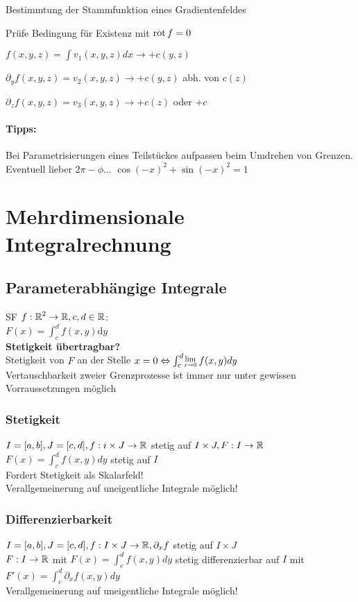 \documentclass[german]{latex4ei/latex4ei_sheet}
\begin{document}
\begin{cookbox}{Bestimmtung der Stammfunktion eines Gradientenfeldes}
\item Pr\"ufe Bedingung f\"ur Existenz mit $\operatorname{rot} f=0$
\item $f(x,y,z)=\int v_1(x,y,z) d x \rightarrow + c(y,z)$
\item $\partial_y f(x,y,z)=v_2(x,y,z) \rightarrow + c(y,z)$ abh. von $c(z)$
\item $\partial_z f(x,y,z)=v_3(x,y,z) \rightarrow +c(z) $ oder $+c$
\end{cookbox}

\paragraph{Tipps:} Bei Parametrisierungen eines Teilst\"uckes aufpassen beim Umdrehen von Grenzen. Eventuell lieber $2 \pi - \phi$... $\cos(-x)^2+\sin(-x)^2=1$

\section{Mehrdimensionale Integralrechnung}
\subsection{Parameterabh\"angige Integrale}
SF $f:\operatorname{\mathbb R}^2 \to \operatorname{\mathbb R}, c,d \in \operatorname{\mathbb R}$:\\
$F(x)=\int_c^d \! f(x,y) \mathrm{d} y$\\
\textbf{Stetigkeit \"ubertragbar?}\\
Stetigkeit von $F$ an der Stelle $x = 0 \Leftrightarrow \int_c^d \! \Lim{x \to 0} f(x,y) d y$\\
Vertauschbarkeit zweier Grenzprozesse ist immer nur unter gewissen Vorraussetzungen m\"oglich\\

\subsubsection{Stetigkeit}
$I=[a,b], J=[c,d], f: i \times J \to \operatorname{\mathbb R}$ stetig auf $I \times J, F: I \to \operatorname{\mathbb R}$\\
$F(x)=\int_c^d \! f(x,y) d y$ stetig auf $I$\\
Fordert Stetigkeit als Skalarfeld!\\
Verallgemeinerung auf uneigentliche Integrale m\"oglich!

\subsubsection{Differenzierbarkeit}
$I=[a,b],J=[c,d], f: I \times J \to \operatorname{\mathbb R}, \partial_x f$ stetig auf $I \times J$\\
$F: I \to \operatorname{\mathbb R}$ mit $F(x)=\int_c^d \! f(x,y) d y$ stetig differenzierbar auf $I$ mit $F'(x)=\int_c^d \! \partial_x f(x,y) d y$\\
Verallgemeinerung auf uneigentliche Integrale m\"oglich!
\end{document}
